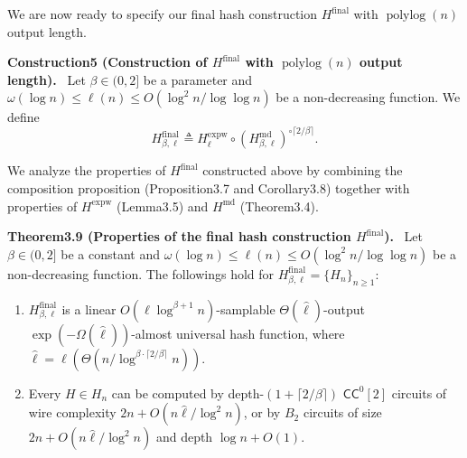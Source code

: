 \documentclass[10pt,a4paper]{article}
\newenvironment{authorclaim}[1]{\par\medskip\noindent\textbf{#1.}\ }{\par\medskip}
\begin{document}
We are now ready to specify our final hash construction $H^{\mathrm{final}}$ with $\operatorname{polylog}(n)$ output length.
\begin{authorclaim}{Construction5 (Construction of $H^{\mathrm{final}}$ with $\operatorname{polylog}(n)$ output length)}
Let $\beta\in(0,2]$ be a parameter and $\omega(\log n)\le\ell(n)\le O(\log^2n/\log\log n)$ be a non-decreasing function. We define
\[H^{\mathrm{final}}_{\beta,\ell}\triangleq H^{\mathrm{expw}}_\ell\circ(H^{\mathrm{md}}_{\beta,\ell})^{\circ\lceil2/\beta\rceil}.\]
\end{authorclaim}
We analyze the properties of $H^{\mathrm{final}}$ constructed above by combining the composition proposition (Proposition3.7 and Corollary3.8) together with properties of $H^{\mathrm{expw}}$ (Lemma3.5) and $H^{\mathrm{md}}$ (Theorem3.4).

\begin{authorclaim}{Theorem3.9 (Properties of the final hash construction $H^{\mathrm{final}}$)}
Let $\beta\in(0,2]$ be a constant and $\omega(\log n)\le\ell(n)\le O(\log^2n/\log\log n)$ be a non-decreasing function. The followings hold for $H^{\mathrm{final}}_{\beta,\ell}=\{H_n\}_{n\ge1}$:
\begin{enumerate}
\item $H^{\mathrm{final}}_{\beta,\ell}$ is a linear $O(\ell\log^{\beta+1}n)$-samplable $\Theta(\hat\ell)$-output $\exp(-\Omega(\hat\ell))$-almost universal hash function, where $\hat\ell=\ell(\Theta(n/\log^{\beta\cdot\lceil2/\beta\rceil}n))$.
\item Every $H\in H_n$ can be computed by depth-$(1+\lceil2/\beta\rceil)$ $\mathsf{CC}^0[2]$ circuits of wire complexity $2n+O(n\hat\ell/\log^2n)$, or by $B_2$ circuits of size $2n+O(n\hat\ell/\log^2n)$ and depth $\log n+O(1)$.
\end{enumerate}
\end{authorclaim}
\end{document}

